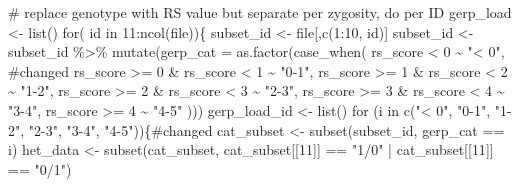 \documentclass[
  letterpaper,
  DIV=11,
  numbers=noendperiod]{scrreprt}
\newenvironment{Shaded}{}{}
\newcommand{\AttributeTok}[1]{\textcolor[rgb]{0.84,0.23,0.29}{#1}}
\newcommand{\CommentTok}[1]{\textcolor[rgb]{0.42,0.45,0.49}{#1}}
\newcommand{\ControlFlowTok}[1]{\textcolor[rgb]{0.84,0.23,0.29}{#1}}
\newcommand{\DecValTok}[1]{\textcolor[rgb]{0.00,0.36,0.77}{#1}}
\newcommand{\FunctionTok}[1]{\textcolor[rgb]{0.44,0.26,0.76}{#1}}
\newcommand{\NormalTok}[1]{\textcolor[rgb]{0.14,0.16,0.18}{#1}}
\newcommand{\OtherTok}[1]{\textcolor[rgb]{0.44,0.26,0.76}{#1}}
\newcommand{\SpecialCharTok}[1]{\textcolor[rgb]{0.00,0.36,0.77}{#1}}
\newcommand{\StringTok}[1]{\textcolor[rgb]{0.01,0.18,0.38}{#1}}
\begin{document}
\begin{Shaded}
\begin{Highlighting}[]
  \CommentTok{\# replace genotype with RS value but separate per zygosity, do per ID}
\NormalTok{  gerp\_load }\OtherTok{\textless{}{-}} \FunctionTok{list}\NormalTok{()}
  \ControlFlowTok{for}\NormalTok{( id }\ControlFlowTok{in} \DecValTok{11}\SpecialCharTok{:}\FunctionTok{ncol}\NormalTok{(file))\{}
\NormalTok{    subset\_id }\OtherTok{\textless{}{-}}\NormalTok{ file[,}\FunctionTok{c}\NormalTok{(}\DecValTok{1}\SpecialCharTok{:}\DecValTok{10}\NormalTok{, id)]}
\NormalTok{    subset\_id }\OtherTok{\textless{}{-}}\NormalTok{ subset\_id }\SpecialCharTok{\%\textgreater{}\%} \FunctionTok{mutate}\NormalTok{(}\AttributeTok{gerp\_cat =} \FunctionTok{as.factor}\NormalTok{(}\FunctionTok{case\_when}\NormalTok{(}
\NormalTok{        rs\_score }\SpecialCharTok{\textless{}} \DecValTok{0} \SpecialCharTok{\textasciitilde{}} \StringTok{"\textless{} 0"}\NormalTok{, }\CommentTok{\#changed}
\NormalTok{        rs\_score }\SpecialCharTok{\textgreater{}=} \DecValTok{0} \SpecialCharTok{\&}\NormalTok{ rs\_score }\SpecialCharTok{\textless{}} \DecValTok{1} \SpecialCharTok{\textasciitilde{}} \StringTok{"0{-}1"}\NormalTok{,}
\NormalTok{        rs\_score }\SpecialCharTok{\textgreater{}=} \DecValTok{1} \SpecialCharTok{\&}\NormalTok{ rs\_score }\SpecialCharTok{\textless{}} \DecValTok{2} \SpecialCharTok{\textasciitilde{}} \StringTok{"1{-}2"}\NormalTok{,}
\NormalTok{        rs\_score }\SpecialCharTok{\textgreater{}=} \DecValTok{2} \SpecialCharTok{\&}\NormalTok{ rs\_score }\SpecialCharTok{\textless{}} \DecValTok{3} \SpecialCharTok{\textasciitilde{}} \StringTok{"2{-}3"}\NormalTok{,}
\NormalTok{        rs\_score }\SpecialCharTok{\textgreater{}=} \DecValTok{3} \SpecialCharTok{\&}\NormalTok{ rs\_score }\SpecialCharTok{\textless{}} \DecValTok{4} \SpecialCharTok{\textasciitilde{}} \StringTok{"3{-}4"}\NormalTok{,}
\NormalTok{        rs\_score }\SpecialCharTok{\textgreater{}=} \DecValTok{4} \SpecialCharTok{\textasciitilde{}} \StringTok{"4{-}5"}
\NormalTok{    )))}
\NormalTok{    gerp\_load\_id }\OtherTok{\textless{}{-}} \FunctionTok{list}\NormalTok{()}
    \ControlFlowTok{for}\NormalTok{ (i }\ControlFlowTok{in} \FunctionTok{c}\NormalTok{(}\StringTok{"\textless{} 0"}\NormalTok{, }\StringTok{"0{-}1"}\NormalTok{, }\StringTok{"1{-}2"}\NormalTok{, }\StringTok{"2{-}3"}\NormalTok{, }\StringTok{"3{-}4"}\NormalTok{, }\StringTok{"4{-}5"}\NormalTok{))\{}\CommentTok{\#changed}
\NormalTok{        cat\_subset }\OtherTok{\textless{}{-}} \FunctionTok{subset}\NormalTok{(subset\_id, gerp\_cat }\SpecialCharTok{==}\NormalTok{ i)}
\NormalTok{        het\_data }\OtherTok{\textless{}{-}} \FunctionTok{subset}\NormalTok{(cat\_subset, cat\_subset[[}\DecValTok{11}\NormalTok{]] }\SpecialCharTok{==} \StringTok{"1/0"} \SpecialCharTok{|}\NormalTok{ cat\_subset[[}\DecValTok{11}\NormalTok{]] }\SpecialCharTok{==} \StringTok{"0/1"}\NormalTok{)}

\end{Highlighting}
\end{Shaded}
\end{document}
